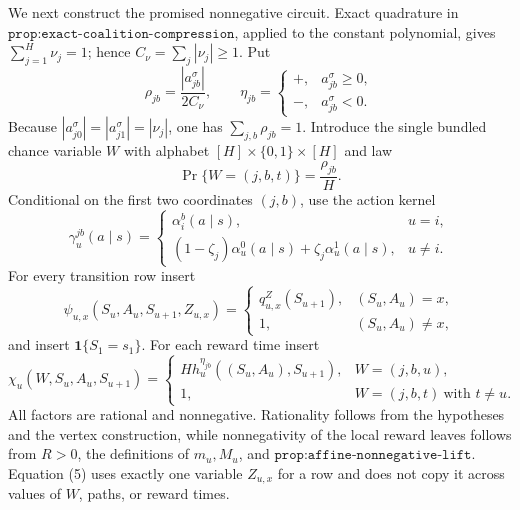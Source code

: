 We next construct the promised nonnegative circuit.  Exact quadrature in \(\texttt{prop:exact-coalition-compression}\), applied to the constant polynomial, gives \(\sum_{j=1}^H\nu_j=1\); hence \(C_\nu=\sum_j|\nu_j|\ge1\).  Put
\[
 \rho_{jb}=\frac{|a_{jb}^\sigma|}{2C_\nu},
 \qquad
 \eta_{jb}=\begin{cases}
 +,&a_{jb}^\sigma\ge0,\\
 -,&a_{jb}^\sigma<0.
 \end{cases}
\]
Because \(|a_{j0}^\sigma|=|a_{j1}^\sigma|=|\nu_j|\), one has \(\sum_{j,b}\rho_{jb}=1\).  Introduce the single bundled chance variable \(W\) with alphabet \([H]\times\{0,1\}\times[H]\) and law
\[
 \Pr\{W=(j,b,t)\}=\frac{\rho_{jb}}{H}.
 \tag{3}
\]
Conditional on the first two coordinates \((j,b)\), use the action kernel
\[
 \gamma_u^{jb}(a\mid s)=
 \begin{cases}
 \alpha_i^b(a\mid s),&u=i,\\
 (1-\zeta_j)\alpha_u^0(a\mid s)+\zeta_j\alpha_u^1(a\mid s),&u\ne i.
 \end{cases}
 \tag{4}
\]
For every transition row insert
\[
 \psi_{u,x}(S_u,A_u,S_{u+1},Z_{u,x})=
 \begin{cases}
 q^{Z}_{u,x}(S_{u+1}),&(S_u,A_u)=x,\\
 1,&(S_u,A_u)\ne x,
 \end{cases}
 \tag{5}
\]
and insert \(\mathbf 1\{S_1=s_1\}\).  For each reward time insert
\[
 \chi_u(W,S_u,A_u,S_{u+1})=
 \begin{cases}
 Hh_u^{\eta_{jb}}((S_u,A_u),S_{u+1}),&W=(j,b,u),\\
 1,&W=(j,b,t)\ \text{with }t\ne u.
 \end{cases}
 \tag{6}
\]
All factors are rational and nonnegative.  Rationality follows from the hypotheses and the vertex construction, while nonnegativity of the local reward leaves follows from \(R>0\), the definitions of \(m_u,M_u\), and \(\texttt{prop:affine-nonnegative-lift}\).  Equation (5) uses exactly one variable \(Z_{u,x}\) for a row and does not copy it across values of \(W\), paths, or reward times.

